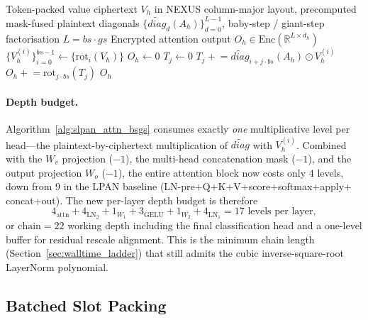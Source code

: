 \begin{algorithm}[htbp]
\caption{\textsc{SynthAttn-BSGS} --- Synthesizer attention with Halevi--Shoup BSGS}
\label{alg:slpan_attn_bsgs}
\begin{algorithmic}[1]
\REQUIRE Token-packed value ciphertext $V_h$ in NEXUS column-major layout, precomputed mask-fused plaintext diagonals $\{\widetilde{\mathit{diag}}_{d}(A_h)\}_{d=0}^{L-1}$, baby-step / giant-step factorisation $L = bs \cdot gs$
\ENSURE Encrypted attention output $O_h \in \mathrm{Enc}(\mathbb{R}^{L \times d_h})$
\STATE $\{V_h^{(i)}\}_{i=0}^{bs-1} \gets \{\mathrm{rot}_i(V_h)\}$ 
\STATE $O_h \gets 0$
    \STATE $T_j \gets 0$
        \STATE $T_j \mathrel{+}= \widetilde{\mathit{diag}}_{i + j \cdot bs}(A_h) \odot V_h^{(i)}$ 
    \ENDFOR
    \STATE $O_h \mathrel{+}= \mathrm{rot}_{j \cdot bs}(T_j)$ 
\ENDFOR
\RETURN $O_h$
\end{algorithmic}
\end{algorithm}

\paragraph{Depth budget.} Algorithm~\ref{alg:slpan_attn_bsgs} consumes exactly \emph{one} multiplicative level per head---the plaintext-by-ciphertext multiplication of $\widetilde{\mathit{diag}}$ with $V_h^{(i)}$. Combined with the $W_v$ projection ($-1$), the multi-head concatenation mask ($-1$), and the output projection $W_o$ ($-1$), the entire attention block now costs only $4$ levels, down from $9$ in the LPAN baseline (LN-pre$+$Q$+$K$+$V$+$score$+$softmax$+$apply$+$concat$+$out). The new per-layer depth budget is therefore
\[
4_{\text{attn}} + 4_{\text{LN}_2} + 1_{W_1} + 3_{\text{GELU}} + 1_{W_2} + 4_{\text{LN}_1} = 17 \text{ levels per layer},
\]
or $\mathrm{chain} = 22$ working depth including the final classification head and a one-level buffer for residual rescale alignment. This is the minimum chain length (Section~\ref{sec:walltime_ladder}) that still admits the cubic inverse-square-root LayerNorm polynomial.

\subsection{Batched Slot Packing}
\label{sec:slpan_batch}

